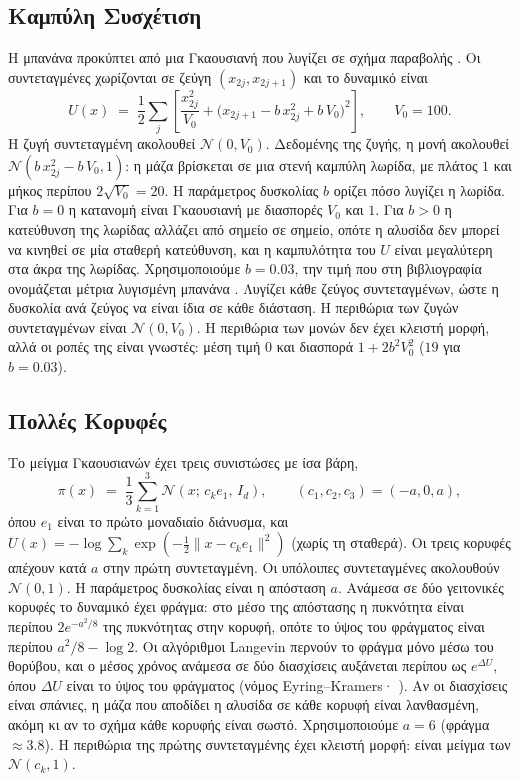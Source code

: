\subsection{Καμπύλη Συσχέτιση}
\label{sec:bg-banana}

Η μπανάνα προκύπτει από μια Γκαουσιανή που λυγίζει σε σχήμα παραβολής
\citep{haario1999adaptive}. Οι συντεταγμένες χωρίζονται σε ζεύγη
$(x_{2j}, x_{2j+1})$ και το δυναμικό είναι
\begin{equation}
  U(x) \;=\; \frac12 \sum_{j} \left[ \frac{x_{2j}^2}{V_0}
  + \bigl( x_{2j+1} - b\, x_{2j}^2 + b\, V_0 \bigr)^2 \right],
  \qquad V_0 = 100.
\end{equation}
Η ζυγή συντεταγμένη ακολουθεί $\mathcal{N}(0, V_0)$. Δεδομένης της ζυγής, η μονή
ακολουθεί $\mathcal{N}(b\, x_{2j}^2 - b\, V_0, 1)$: η μάζα βρίσκεται σε μια στενή
καμπύλη λωρίδα, με πλάτος $1$ και μήκος περίπου $2\sqrt{V_0} = 20$. Η
παράμετρος δυσκολίας $b$ ορίζει πόσο λυγίζει η λωρίδα. Για $b = 0$ η κατανομή
είναι Γκαουσιανή με διασπορές $V_0$ και $1$. Για $b > 0$ η κατεύθυνση της λωρίδας
αλλάζει από σημείο σε σημείο, οπότε η αλυσίδα δεν μπορεί να κινηθεί σε μία
σταθερή κατεύθυνση, και η καμπυλότητα του $U$ είναι μεγαλύτερη στα άκρα της
λωρίδας. Χρησιμοποιούμε $b = 0.03$, την τιμή που στη βιβλιογραφία ονομάζεται
μέτρια λυγισμένη μπανάνα \citep{sejdinovic2014kernel}. Λυγίζει κάθε ζεύγος συντεταγμένων, ώστε η δυσκολία ανά ζεύγος να
είναι ίδια σε κάθε διάσταση. Η περιθώρια των ζυγών συντεταγμένων είναι
$\mathcal{N}(0, V_0)$. Η περιθώρια των μονών δεν έχει κλειστή μορφή, αλλά οι
ροπές της είναι γνωστές: μέση τιμή $0$ και διασπορά $1 + 2 b^2 V_0^2$ ($19$ για
$b = 0.03$).

\subsection{Πολλές Κορυφές}
\label{sec:bg-mixture}

Το μείγμα Γκαουσιανών έχει τρεις συνιστώσες με ίσα βάρη,
\begin{equation}
  \pi(x) \;=\; \frac13 \sum_{k=1}^{3} \mathcal{N}(x;\, c_k e_1,\, I_d),
  \qquad (c_1, c_2, c_3) = (-a, 0, a),
\end{equation}
όπου $e_1$ είναι το πρώτο μοναδιαίο διάνυσμα, και
$U(x) = -\log \sum_k \exp(-\tfrac12 \|x - c_k e_1\|^2)$ (χωρίς τη σταθερά). Οι
τρεις κορυφές απέχουν κατά $a$ στην πρώτη συντεταγμένη. Οι υπόλοιπες
συντεταγμένες ακολουθούν $\mathcal{N}(0, 1)$. Η παράμετρος δυσκολίας είναι η
απόσταση $a$. Ανάμεσα σε δύο γειτονικές κορυφές το δυναμικό έχει φράγμα: στο μέσο της
απόστασης η πυκνότητα είναι περίπου $2e^{-a^2/8}$ της πυκνότητας στην κορυφή,
οπότε το ύψος του φράγματος είναι περίπου $a^2/8 - \log 2$. Οι αλγόριθμοι Langevin περνούν το φράγμα μόνο μέσω του θορύβου,
και ο μέσος χρόνος ανάμεσα σε δύο διασχίσεις αυξάνεται περίπου ως $e^{\Delta U}$,
όπου $\Delta U$ είναι το ύψος του φράγματος (νόμος Eyring--Kramers·
\citealp{bovier2004metastability}). Αν οι διασχίσεις είναι σπάνιες, η μάζα που αποδίδει η αλυσίδα σε κάθε κορυφή
είναι λανθασμένη, ακόμη κι αν το σχήμα κάθε κορυφής είναι σωστό. Χρησιμοποιούμε
$a = 6$ (φράγμα $\approx 3.8$). Η περιθώρια της πρώτης συντεταγμένης έχει
κλειστή μορφή: είναι μείγμα των $\mathcal{N}(c_k, 1)$.

